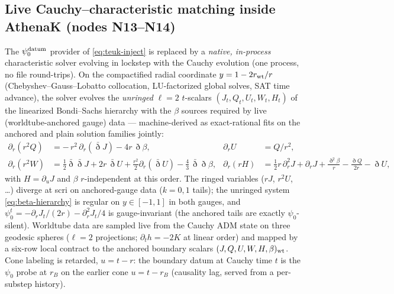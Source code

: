 \begin{nfblock}
\subsection{Live Cauchy--characteristic matching inside AthenaK
(nodes N13--N14)}
\label{sec:liveccm}

The $\psi_0^{\rm datum}$ provider of \eqref{eq:teuk-inject} is replaced
by a \emph{native, in-process} characteristic solver evolving in
lockstep with the Cauchy evolution (one process, no file round-trips).
On the compactified radial coordinate $y = 1 - 2r_{\rm wt}/r$
(Chebyshev--Gauss--Lobatto collocation, LU-factorized global solves,
SAT time advance), the solver evolves the \emph{unringed} $\ell{=}2$
$t$-scalars $(J_t,Q_t,U_t,W_t,H_t)$ of the linearized Bondi--Sachs
hierarchy with the $\beta$ sources required by live (worldtube-anchored
gauge) data — machine-derived as exact-rational fits on the anchored
and plain solution families jointly:
\begin{align}
\partial_r(r^2 Q) &= -\,r^2\,\partial_r(\bar\eth J) - 4r\,\eth\beta,
&
\partial_r U &= Q/r^2,
\nonumber\\
\partial_r(r^2 W) &= \tfrac12\bar\eth\bar\eth J + 2r\,\bar\eth U
 + \tfrac{r^2}{2}\partial_r(\bar\eth U) - \tfrac43\,\bar\eth\eth\beta,
&
\partial_r(rH) &= \tfrac12 r\,\partial_r^2 J + \partial_r J
 + \frac{\eth^2\beta}{r} - \frac{\eth Q}{2r} - \eth U,
\label{eq:beta-hierarchy}
\end{align}
with $H=\partial_u J$ and $\beta$ $r$-independent at this order. The
ringed variables ($rJ$, $r^2U$, \dots) diverge at scri on anchored-gauge
data ($k=0,1$ tails); the unringed system \eqref{eq:beta-hierarchy} is
regular on $y\in[-1,1]$ in both gauges, and
$\psi_0^t = -\partial_r J_t/(2r) - \partial_r^2 J_t/4$ is gauge-invariant
(the anchored tails are exactly $\psi_0$-silent). Worldtube data are
sampled live from the Cauchy ADM state on three geodesic spheres
($\ell{=}2$ projections; $\partial_t h = -2K$ at linear order) and mapped
by a six-row local contract to the anchored boundary scalars
$(J,Q,U,W,H,\beta)_{\rm wt}$. Cone labeling is retarded, $u = t - r$:
the boundary datum at Cauchy time $t$ is the $\psi_0$ probe at $r_B$ on
the earlier cone $u = t - r_B$ (causality lag, served from a per-substep
history).


\end{nfblock}
